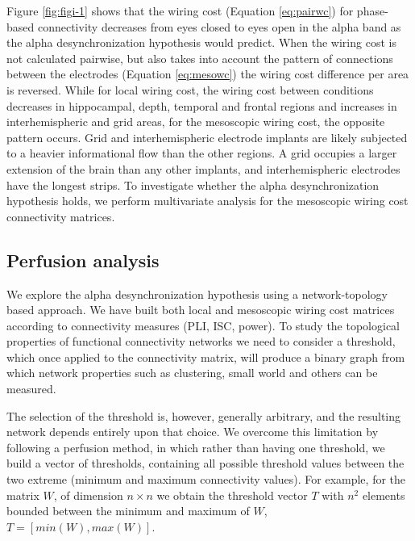 \documentclass[11pt, onecolumn]{article}
\begin{document}
{Figure \ref{fig:figi-1} shows that the wiring cost (Equation \ref{eq:pairwc}) for phase-based connectivity decreases from eyes closed to eyes open in the alpha band as the alpha desynchronization hypothesis would predict.
When the wiring cost is not calculated pairwise, but also takes into account the pattern of connections between the electrodes (Equation \ref{eq:mesowc}) the wiring cost difference per area is reversed. While for local wiring cost, the wiring cost between conditions decreases in hippocampal, depth, temporal and frontal regions and increases in interhemispheric and grid areas, for the mesoscopic wiring cost, the opposite pattern occurs. 
Grid and interhemispheric electrode implants are likely subjected to a heavier informational flow than the other regions. A grid occupies a larger extension of the brain than any other implants, and interhemispheric electrodes have the longest strips.  
To investigate whether the alpha desynchronization hypothesis holds, we perform multivariate analysis for the mesoscopic wiring cost connectivity matrices.
 
\subsection{Perfusion analysis}
We explore the alpha desynchronization hypothesis using a network-topology based approach. We have built both local and mesoscopic wiring cost matrices according to connectivity measures (PLI, ISC, power). To study the  topological properties of functional connectivity networks we need to consider a threshold, which once applied to the connectivity matrix, will produce a binary graph from which network properties such as clustering, small world and others can be measured.

The selection of the threshold is, however, generally arbitrary, and the resulting network depends entirely upon that choice.
We overcome this limitation by following a perfusion method, in which rather than having one threshold, we build a vector of thresholds,  containing all possible threshold values between the two extreme (minimum and maximum connectivity values). For example, for the matrix $W$, of dimension $n \times n$ we obtain the threshold vector $T$ with $n^2$ elements bounded between the minimum and maximum of $W$, $T = [min(W), max(W)]$.
 
}
\end{document}

